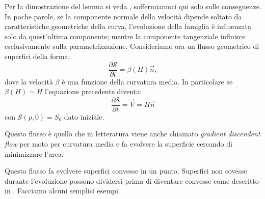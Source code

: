 Per la dimostrazione del lemma si veda \cite[][]{gui:sapiro}, soffermiamoci qui solo sulle conseguenze.
In poche parole, se la componente normale della velocità dipende soltato da caratteristiche geometriche della curva, l'evoluzione della famiglia è influenzata solo da quest'ultima componente; mentre la componente tangenziale influisce esclusivamente sulla parametrizzazione.
Consideriamo ora un flusso geometrico di superfici della forma:
\[
\frac{\partial\mathcal{S}}{\partial t} = \beta(H)\vec{n},
\] 
dove la velocità $\beta$ è una funzione della curvatura media. In particolare se $\beta(H)=H$ l'equazione precedente diventa:
\begin{equation}
  \label{eq:cp-123}
  \frac{\partial\mathcal{S}}{\partial t} = \vec{V} = H\vec{n}
\end{equation}
con $\mathcal{S}(p,0)=S_0$ dato iniziale.
\begin{osservazione}
Questo flusso è quello che in letteratura viene anche chiamato
\emph{gradient discendent flow} per moto per curvatura media e fa
evolvere la  superficie cercando di minimizzare l'area. 
\end{osservazione}
\begin{osservazione}
Questo flusso fa evolvere superfici convesse in un punto. Superfici
non covesse durante l'evoluzione possono dividersi prima di diventare
convesse come descritto in \cite[][]{gui:sapiro}. Facciamo alcuni
semplici esempi. 
\end{osservazione}

